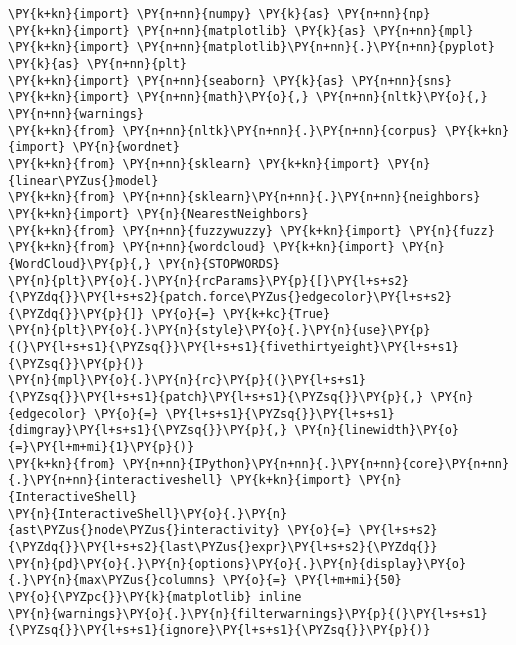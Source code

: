     \begin{tcolorbox}[breakable, size=fbox, boxrule=1pt, pad at break*=1mm,colback=cellbackground, colframe=cellborder]
\begin{Verbatim}[commandchars=\\\{\}]
\PY{k+kn}{import} \PY{n+nn}{numpy} \PY{k}{as} \PY{n+nn}{np}
\PY{k+kn}{import} \PY{n+nn}{matplotlib} \PY{k}{as} \PY{n+nn}{mpl}
\PY{k+kn}{import} \PY{n+nn}{matplotlib}\PY{n+nn}{.}\PY{n+nn}{pyplot} \PY{k}{as} \PY{n+nn}{plt}
\PY{k+kn}{import} \PY{n+nn}{seaborn} \PY{k}{as} \PY{n+nn}{sns}
\PY{k+kn}{import} \PY{n+nn}{math}\PY{o}{,} \PY{n+nn}{nltk}\PY{o}{,} \PY{n+nn}{warnings}
\PY{k+kn}{from} \PY{n+nn}{nltk}\PY{n+nn}{.}\PY{n+nn}{corpus} \PY{k+kn}{import} \PY{n}{wordnet}
\PY{k+kn}{from} \PY{n+nn}{sklearn} \PY{k+kn}{import} \PY{n}{linear\PYZus{}model}
\PY{k+kn}{from} \PY{n+nn}{sklearn}\PY{n+nn}{.}\PY{n+nn}{neighbors} \PY{k+kn}{import} \PY{n}{NearestNeighbors}
\PY{k+kn}{from} \PY{n+nn}{fuzzywuzzy} \PY{k+kn}{import} \PY{n}{fuzz}
\PY{k+kn}{from} \PY{n+nn}{wordcloud} \PY{k+kn}{import} \PY{n}{WordCloud}\PY{p}{,} \PY{n}{STOPWORDS}
\PY{n}{plt}\PY{o}{.}\PY{n}{rcParams}\PY{p}{[}\PY{l+s+s2}{\PYZdq{}}\PY{l+s+s2}{patch.force\PYZus{}edgecolor}\PY{l+s+s2}{\PYZdq{}}\PY{p}{]} \PY{o}{=} \PY{k+kc}{True}
\PY{n}{plt}\PY{o}{.}\PY{n}{style}\PY{o}{.}\PY{n}{use}\PY{p}{(}\PY{l+s+s1}{\PYZsq{}}\PY{l+s+s1}{fivethirtyeight}\PY{l+s+s1}{\PYZsq{}}\PY{p}{)}
\PY{n}{mpl}\PY{o}{.}\PY{n}{rc}\PY{p}{(}\PY{l+s+s1}{\PYZsq{}}\PY{l+s+s1}{patch}\PY{l+s+s1}{\PYZsq{}}\PY{p}{,} \PY{n}{edgecolor} \PY{o}{=} \PY{l+s+s1}{\PYZsq{}}\PY{l+s+s1}{dimgray}\PY{l+s+s1}{\PYZsq{}}\PY{p}{,} \PY{n}{linewidth}\PY{o}{=}\PY{l+m+mi}{1}\PY{p}{)}
\PY{k+kn}{from} \PY{n+nn}{IPython}\PY{n+nn}{.}\PY{n+nn}{core}\PY{n+nn}{.}\PY{n+nn}{interactiveshell} \PY{k+kn}{import} \PY{n}{InteractiveShell}
\PY{n}{InteractiveShell}\PY{o}{.}\PY{n}{ast\PYZus{}node\PYZus{}interactivity} \PY{o}{=} \PY{l+s+s2}{\PYZdq{}}\PY{l+s+s2}{last\PYZus{}expr}\PY{l+s+s2}{\PYZdq{}}
\PY{n}{pd}\PY{o}{.}\PY{n}{options}\PY{o}{.}\PY{n}{display}\PY{o}{.}\PY{n}{max\PYZus{}columns} \PY{o}{=} \PY{l+m+mi}{50}
\PY{o}{\PYZpc{}}\PY{k}{matplotlib} inline
\PY{n}{warnings}\PY{o}{.}\PY{n}{filterwarnings}\PY{p}{(}\PY{l+s+s1}{\PYZsq{}}\PY{l+s+s1}{ignore}\PY{l+s+s1}{\PYZsq{}}\PY{p}{)}


\end{Verbatim}
\end{tcolorbox}
